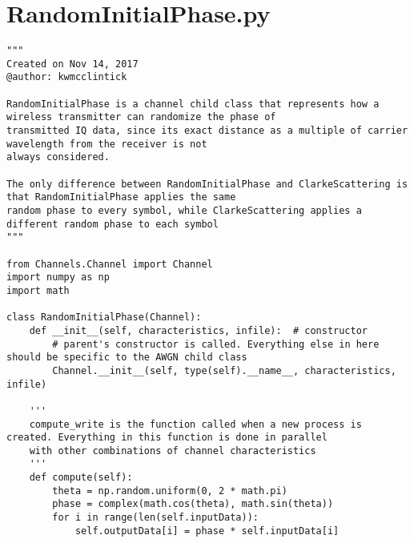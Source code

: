 \section{RandomInitialPhase.py}
\begin{lstlisting}[breaklines]
"""
Created on Nov 14, 2017
@author: kwmcclintick

RandomInitialPhase is a channel child class that represents how a wireless transmitter can randomize the phase of
transmitted IQ data, since its exact distance as a multiple of carrier wavelength from the receiver is not
always considered.

The only difference between RandomInitialPhase and ClarkeScattering is that RandomInitialPhase applies the same
random phase to every symbol, while ClarkeScattering applies a different random phase to each symbol
"""

from Channels.Channel import Channel
import numpy as np
import math

class RandomInitialPhase(Channel):
    def __init__(self, characteristics, infile):  # constructor
        # parent's constructor is called. Everything else in here should be specific to the AWGN child class
        Channel.__init__(self, type(self).__name__, characteristics, infile)

    '''
    compute_write is the function called when a new process is created. Everything in this function is done in parallel
    with other combinations of channel characteristics
    '''
    def compute(self):
        theta = np.random.uniform(0, 2 * math.pi)
        phase = complex(math.cos(theta), math.sin(theta))
        for i in range(len(self.inputData)):
            self.outputData[i] = phase * self.inputData[i]
\end{lstlisting}

